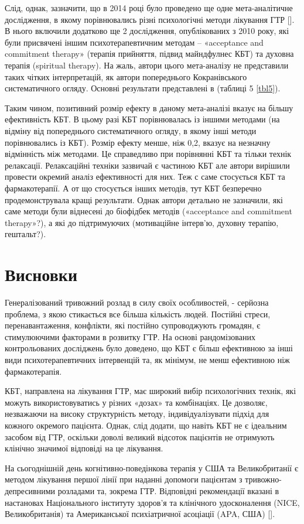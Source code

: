 \documentclass[twocolumn]{article}
\begin{document}
\par Слід, однак, зазначити, що в 2014 році було проведено ще одне мета-аналітичне дослідження, в якому порівнювались різні психологічні методи лікування ГТР [\cite{bib25}]. В нього включили додатково ще 2 дослідження, опублікованих з 2010 року, які були присвячені іншим психотерапевтичним методам – «acceptance and commitment therapy» (терапія прийняття, підвид майндфулнес КБТ) та духовна терапія (spiritual therapy). На жаль, автори цього мета-аналізу не представили таких чітких інтерпретацій, як автори попереднього Кокранівського систематичного огляду. Основні результати представлені в (таблиці 5 \ref{tbl5}).
\par Таким чином, позитивний розмір ефекту в даному мета-аналізі вказує на більшу ефективність КБТ. В цьому разі КБТ порівнювалась із іншими методами (на відміну від попереднього систематичного огляду, в якому інші методи порівнювались із КБТ). Розмір ефекту менше, ніж 0,2, вказує на незначну відмінність між методами. Це справедливо при порівнянні КБТ та тільки технік релаксації. Релаксаційні техніки зазвичай є частиною КБТ але автори вирішили провести окремий аналіз ефективності для них. Теж с саме стосується КБТ та фармакотерапії. А от що стосується інших методів, тут КБТ безперечно продемонструвала кращі результати. Однак автори детально не зазначили, які саме методи були віднесені до біофідбек методів («acceptance and commitment therapy»?), а які до підтримуючих (мотиваційне інтерв’ю, духовну терапію, гештальт?).
\section {Висновки}
\par Генералізований тривожний розлад в силу своїх особливостей, - серйозна проблема, з якою стикається все більша кількість людей. Постійні стреси, перенавантаження, конфлікти, які постійно супроводжують громадян, є стимулюючими факторами в розвитку ГТР. На основі рандомізованих контрольованих досліджень було доведено, що КБТ є більш ефективною за інші види психотерапевтичних інтервенцій та, як мінімум, не менш ефективною ніж фармакотерапія.
\par КБТ, направлена на лікування ГТР, має широкий вибір психологічних технік, які можуть використовуватись у різних «дозах» та комбінаціях. Це дозволяє, незважаючи на високу структурність методу, індивідуалізувати підхід для кожного окремого пацієнта. Однак, слід додати, що навіть КБТ не є ідеальним засобом від ГТР, оскільки доволі великий відсоток пацієнтів не отримують клінічно значимої відповіді на це лікування.
\par На сьогоднішній день когнітивно-поведінкова терапія у США та Великобританії є методом лікування першої лінії при наданні допомоги пацієнтам з тривожно-депресивними розладами та, зокрема ГТР. Відповідні рекомендації вказані в настановах Національного інституту здоров’я та клінічного удосконалення (NICE, Великобританія) та Американської психіатричної асоціації (APA, США) [\cite{bib26}].
\end{document}
